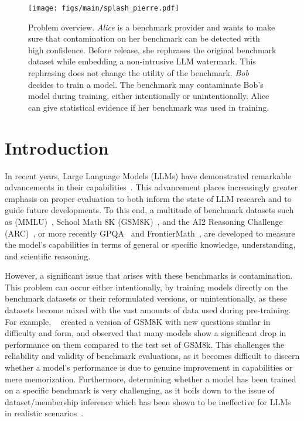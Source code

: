 \vspace{-0.2cm}
\begin{figure*}[h]
    \centering
    \texttt{[image: figs/main/splash\_pierre.pdf]}
    \captionsetup{font=small}
    \caption{
    Problem overview. 
    \emph{Alice} is a benchmark provider and wants to make sure that contamination on her benchmark can be detected with high confidence.
    Before release, she rephrases the original benchmark dataset while embedding a non-intrusive LLM watermark.
    This rephrasing does not change the utility of the benchmark.
    \emph{Bob} decides to train a model.
    The benchmark may contaminate Bob's model during training, either intentionally or unintentionally.
    Alice can give statistical evidence if her benchmark was used in training.
    }
    \vspace{-0.2cm}
    \label{fig:fig1}
\end{figure*}

\vspace{-0.2cm}
\section{Introduction}\label{sec:intro}

In recent years, Large Language Models (LLMs) have demonstrated remarkable advancements in their capabilities~\citep{brown2020language, touvron2023llama}. 
This advancement places increasingly greater emphasis on proper evaluation to both inform the state of LLM research and to guide future developments.
To this end, a multitude of benchmark datasets such as (MMLU)~\citep{hendrycks2020measuring}, School Math 8K (GSM8K)~\citep{cobbe2021training}, and the AI2 Reasoning Challenge (ARC)~\citep{clark2018think}, or more recently GPQA~\citep{rein2023gpqa} and FrontierMath~\citep{glazer2024frontiermath},  are developed to measure the model's capabilities in terms of general or specific knowledge,  understanding, and scientific reasoning.

However, a significant issue that arises with these benchmarks is contamination. 
This problem can occur either intentionally, by training models directly on the benchmark datasets or their reformulated versions, or unintentionally, as these datasets become mixed with the vast amounts of data used during pre-training. 
For example, ~\citet{zhang2024careful} created a version of GSM8K with new questions similar in difficulty and form, and observed that many models show a significant drop in performance on them compared to the test set of GSM8k.
This challenges the reliability and validity of benchmark evaluations, as it becomes difficult to discern whether a model's performance is due to genuine improvement in capabilities or mere memorization.
Furthermore, determining whether a model has been trained on a specific benchmark is very challenging, as it boils down to the issue of dataset/membership inference which has been shown to be ineffective for LLMs in realistic scenarios~\citep{duan2024membership}.


